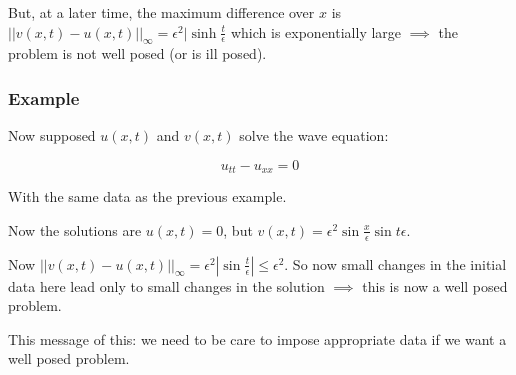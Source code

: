 But, at a later time, the maximum difference over $x$ is $|| v(x, t) - u(x, t) ||_{\infty} = \epsilon^2 | \sinh \frac{t}{\epsilon}$ which is exponentially large $\implies$ the problem is not well posed (or is ill posed).

\subsubsection*{Example}

Now supposed $u(x, t)$ and $v(x,t)$ solve the wave equation:

$$u_{tt} - u_{xx} = 0$$

With the same data as the previous example.

\vspace{\baselineskip}

Now the solutions are $u(x, t) = 0$, but $v(x, t) = \epsilon^2 \sin \frac{x}{\epsilon} \sin {t}{\epsilon}$.

Now $|| v(x, t) - u(x, t) ||_{\infty} = \epsilon^2 | \sin \frac{t}{\epsilon} | \leq \epsilon^2$. So now small changes in the initial data here lead only to small changes in the solution $\implies$ this is now a well posed problem.

This message of this: we need to be care to impose appropriate data if we want a well posed problem.